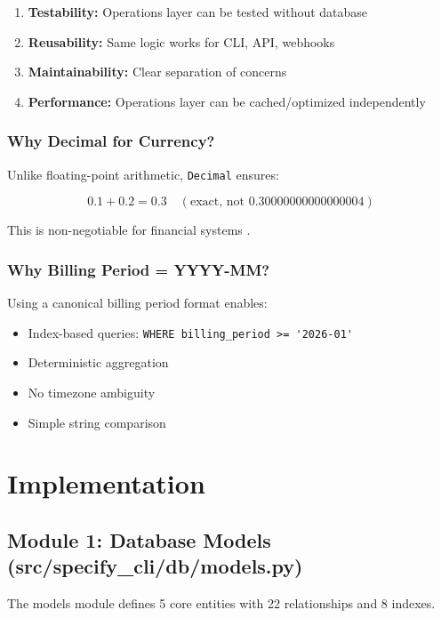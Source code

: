 \documentclass[12pt]{report}
\begin{document}
\begin{enumerate}
    \item \textbf{Testability:} Operations layer can be tested without database
    \item \textbf{Reusability:} Same logic works for CLI, API, webhooks
    \item \textbf{Maintainability:} Clear separation of concerns
    \item \textbf{Performance:} Operations layer can be cached/optimized independently
\end{enumerate}

\subsection{Why Decimal for Currency?}

Unlike floating-point arithmetic, \lstinline{Decimal} ensures:

\begin{equation}
0.1 + 0.2 = 0.3 \quad (\text{exact, not } 0.30000000000000004)
\end{equation}

This is non-negotiable for financial systems \cite{goldberg1991every}.

\subsection{Why Billing Period = YYYY-MM?}

Using a canonical billing period format enables:
\begin{itemize}
    \item Index-based queries: \lstinline{WHERE billing_period >= '2026-01'}
    \item Deterministic aggregation
    \item No timezone ambiguity
    \item Simple string comparison
\end{itemize}

\chapter{Implementation}

\section{Module 1: Database Models (src/specify\_cli/db/models.py)}

The models module defines 5 core entities with 22 relationships and 8 indexes.
\end{document}
